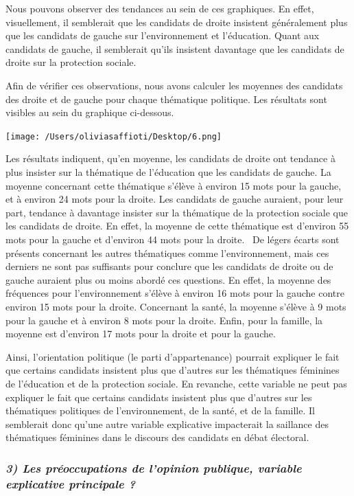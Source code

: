 \documentclass[
  letterpaper,
  DIV=11,
  numbers=noendperiod]{scrartcl}
\begin{document}
Nous pouvons observer des tendances au sein de ces graphiques. En effet,
visuellement, il semblerait que les candidats de droite insistent
généralement plus que les candidats de gauche sur l'environnement et
l'éducation. Quant aux candidats de gauche, il semblerait qu'ils
insistent davantage que les candidats de droite sur la protection
sociale.

Afin de vérifier ces observations, nous avons calculer les moyennes des
candidats des droite et de gauche pour chaque thématique politique. Les
résultats sont visibles au sein du graphique ci-dessous.

\texttt{[image: /Users/oliviasaffioti/Desktop/6.png]}

Les résultats indiquent, qu'en moyenne, les candidats de droite ont
tendance à plus insister sur la thématique de l'éducation que les
candidats de gauche. La moyenne concernant cette thématique s'élève à
environ 15 mots pour la gauche, et à environ 24 mots pour la droite. Les
candidats de gauche auraient, pour leur part, tendance à davantage
insister sur la thématique de la protection sociale que les candidats de
droite. En effet, la moyenne de cette thématique est d'environ 55 mots
pour la gauche et d'environ 44 mots pour la droite. ~De légers écarts
sont présents concernant les autres thématiques comme l'environnement,
mais ces derniers ne sont pas suffisants pour conclure que les candidats
de droite ou de gauche auraient plus ou moins abordé ces questions. En
effet, la moyenne des fréquences pour l'environnement s'élève à environ
16 mots pour la gauche contre environ 15 mots pour la droite. Concernant
la santé, la moyenne s'élève à 9 mots pour la gauche et à environ 8 mots
pour la droite. Enfin, pour la famille, la moyenne est d'environ 17 mots
pour la droite et pour la gauche.

Ainsi, l'orientation politique (le parti d'appartenance) pourrait
expliquer le fait que certains candidats insistent plus que d'autres sur
les thématiques féminines de l'éducation et de la protection sociale. En
revanche, cette variable ne peut pas expliquer le fait que certains
candidats insistent plus que d'autres sur les thématiques politiques de
l'environnement, de la santé, et de la famille. Il semblerait donc
qu'une autre variable explicative impacterait la saillance des
thématiques féminines dans le discours des candidats en débat électoral.

\hypertarget{les-pruxe9occupations-de-lopinion-publique-variable-explicative-principale}{%
\subsubsection{\texorpdfstring{\emph{3) Les préoccupations de l'opinion
publique, variable explicative principale
?}}{3) Les préoccupations de l'opinion publique, variable explicative principale ?}}\label{les-pruxe9occupations-de-lopinion-publique-variable-explicative-principale}}
\end{document}
